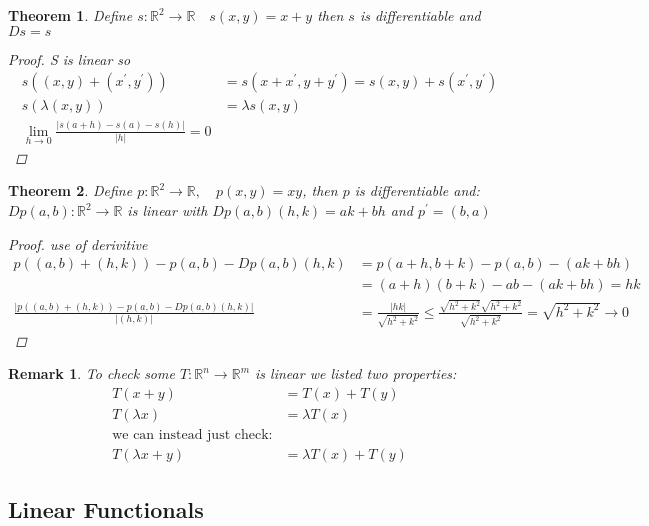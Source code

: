 \documentclass[12pt]{article}
\def\RR{\mathbb{R}}
\newtheorem{theorem}{Theorem}[section]
\newtheorem*{remark}{Remark}
\begin{document}
\begin{theorem}\label{s}
Define $s:\RR^2 \rightarrow \RR \quad s(x,y)=x + y$ then $s$ is differentiable  and $Ds = s$
\begin{proof}
S is linear so
\begin{align*}
s((x,y) + (x^{'},y^{'})) &=s(x+x^{'},y+y^{'})= s(x,y) + s(x^{'},y^{'})\\
s(\lambda(x,y)) &= \lambda s(x,y)\\
\lim_{h \to 0}\frac{|s(a+h) - s(a) -s(h)|}{|h|} = 0
\end{align*}
\end{proof}
\end{theorem}

\begin{theorem}\label{p}
Define $p:\RR^2 \rightarrow \RR, \quad p(x,y)=xy$, then $p$ is differentiable  and:\\
$Dp(a,b):\RR^2 \rightarrow \RR$ is linear with $Dp(a,b)(h,k) = ak + bh$ and $p^{'} = (b,a)$
\begin{proof}
use of derivitive
\begin{align*}
p((a,b)+(h,k)) - p(a,b) - Dp(a,b)(h,k) &= p(a+h,b+k) - p(a,b) - (ak + bh)\\
&=(a+h)(b+k) - ab - (ak + bh) = hk\\
\frac{|p((a,b)+(h,k)) - p(a,b) - Dp(a,b)(h,k)|}{|(h,k)|} &= \frac{|hk|}{\sqrt{h^2 + k^2}} \leq  \frac{\sqrt{h^2 + k^2}\sqrt{h^2 + k^2}}{\sqrt{h^2 + k^2}} = \sqrt{h^2 + k^2} \rightarrow 0
\end{align*}
\end{proof}
\end{theorem}

\begin{remark}
To check some $T:\RR^n \rightarrow \RR^m$ is linear we listed two properties:
\begin{align*}
T(x+y) &= T(x) +T(y)\\
T(\lambda x) &= \lambda T(x)\\
\text{we can instead just check:}\\
T( \lambda x + y) &= \lambda T(x) + T(y)
\end{align*}
\end{remark}

\subsection{Linear Functionals}
\end{document}
